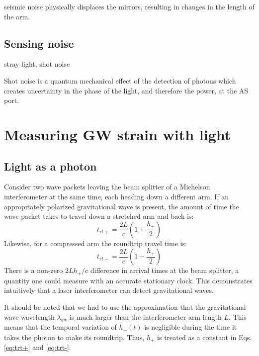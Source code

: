 seismic noise physically displaces the mirrors, resulting in changes in the length
of the arm. 

\subsection{Sensing noise}
stray light, shot noise

Shot noise is a quantum mechanical effect of the detection
of photons which creates uncertainty in the phase of the light, and
therefore the power, at the AS port.




\section{Measuring GW strain with light}
\subsection{Light as a photon} 
Consider two wave packets leaving the beam splitter of a Michelson
interferometer at the same time, each heading down a different arm. If
an appropriately polarized gravitational wave is present, the amount
of time the wave packet takes to travel down a stretched arm and back
is:
\begin{equation}
\label{eq:trt+} 
t_{rt+} = \frac{2 L}{c} \left( 1 + \frac{h_+}{2} \right)
\end{equation}
Likewise, for a compressed arm the roundtrip travel time is:
\begin{equation}
\label{eq:trt-} 
t_{rt-} = \frac{2 L}{c} \left( 1 - \frac{h_+}{2} \right)
\end{equation}
There is a non-zero $2Lh_+/c$ difference in arrival times at the beam splitter, a quantity
one could measure with an accurate stationary clock. This demonstrates intuitively that
a laser interferometer can detect gravitational waves.

It should be noted that we had to use the approximation that the
gravitational wave wavelength $\lambda_{gw}$ is much larger than the
interferometer arm length $L$. This means that the temporal variation
of $h_+(t)$ is negligible during the time it takes the photon to make
its roundtrip. Thus, $h_+$ is treated as a constant in
Eqs. \ref{eq:trt+} and \ref{eq:trt-}.


